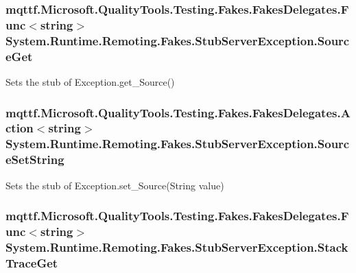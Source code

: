 \hypertarget{class_system_1_1_runtime_1_1_remoting_1_1_fakes_1_1_stub_server_exception_a1f7acb56c19b1934bb01c38d75a20e86}{
\subsubsection[{Source\-Get}]{\setlength{\rightskip}{0pt plus 5cm}mqttf.\-Microsoft.\-Quality\-Tools.\-Testing.\-Fakes.\-Fakes\-Delegates.\-Func$<$string$>$ System.\-Runtime.\-Remoting.\-Fakes.\-Stub\-Server\-Exception.\-Source\-Get}}\label{class_system_1_1_runtime_1_1_remoting_1_1_fakes_1_1_stub_server_exception_a1f7acb56c19b1934bb01c38d75a20e86}


Sets the stub of Exception.\-get\-\_\-\-Source()

\hypertarget{class_system_1_1_runtime_1_1_remoting_1_1_fakes_1_1_stub_server_exception_afb64e182b9561999b8bab7456dea062c}{
\subsubsection[{Source\-Set\-String}]{\setlength{\rightskip}{0pt plus 5cm}mqttf.\-Microsoft.\-Quality\-Tools.\-Testing.\-Fakes.\-Fakes\-Delegates.\-Action$<$string$>$ System.\-Runtime.\-Remoting.\-Fakes.\-Stub\-Server\-Exception.\-Source\-Set\-String}}\label{class_system_1_1_runtime_1_1_remoting_1_1_fakes_1_1_stub_server_exception_afb64e182b9561999b8bab7456dea062c}


Sets the stub of Exception.\-set\-\_\-\-Source(\-String value)

\hypertarget{class_system_1_1_runtime_1_1_remoting_1_1_fakes_1_1_stub_server_exception_aff2ea01250e4caf981d85c62b241bad7}{
\subsubsection[{Stack\-Trace\-Get}]{\setlength{\rightskip}{0pt plus 5cm}mqttf.\-Microsoft.\-Quality\-Tools.\-Testing.\-Fakes.\-Fakes\-Delegates.\-Func$<$string$>$ System.\-Runtime.\-Remoting.\-Fakes.\-Stub\-Server\-Exception.\-Stack\-Trace\-Get}}\label{class_system_1_1_runtime_1_1_remoting_1_1_fakes_1_1_stub_server_exception_aff2ea01250e4caf981d85c62b241bad7}


